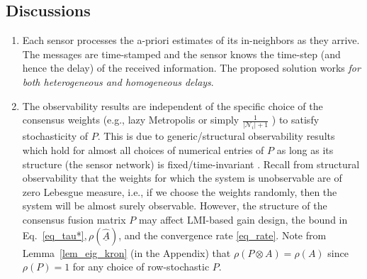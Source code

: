 \documentclass[journal]{IEEEtran}
\newcommand{\tb}{\color{blue}}
\def\mc{\mathcal}
\begin{document}
\subsection{Discussions}
\begin{enumerate}
	\item Each sensor processes the a-priori estimates of its in-neighbors as they arrive. The messages are time-stamped and the sensor knows the time-step (and hence the delay) of the received information. The  proposed solution works \textit{for both heterogeneous and homogeneous delays}. 
	\item The observability results are independent of the specific choice of the consensus weights (e.g., lazy Metropolis \cite{bu2018accelerated} or simply $\frac{1}{|\mc{N}_i|+1}$ \cite{Themis_delay})  to satisfy stochasticity of $P$. This is due to  generic/structural observability results which hold for almost all choices of numerical entries of $P$ as long as its structure (the sensor network) is fixed/time-invariant \cite{commault2018classification,icassp2016}. Recall from structural observability that the weights for which the system is unobservable are of zero Lebesgue measure, i.e., if we choose the weights randomly, then the system will be almost surely observable. However, the structure of the consensus fusion matrix $P$ may affect  LMI-based gain design, the bound in Eq.~\eqref{eq_tau*}$, \rho(\underline{\widehat{A}})$, and the convergence rate \eqref{eq_rate}. Note from Lemma~\ref{lem_eig_kron} (in the Appendix) that $\rho(P \otimes A)= \rho(A)$ since $\rho(P)=1$ for any choice of row-stochastic $P$.  
	

\end{enumerate}
\end{document}
